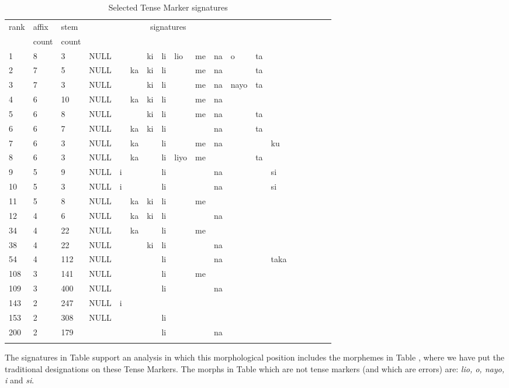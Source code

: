\documentclass[output=paper,colorlinks,citecolor=brown]{langscibook}
\begin{document}
 
\begin{table}

\label{top-TM-sigs}
\begin{tabular}{lllllllllllllllllll}\lsptoprule
rank& affix & stem  & \multicolumn{9}{c}{signatures} \\
 & count & count    \\ \midrule
1 & 8 & 3 & NULL &     && ki & li & lio & me & na & o  & ta  \\
2 &  7 & 5 & NULL &&  ka & ki & li &     & me & na &    & ta  \\
3 &  7 & 3 & NULL &&     & ki & li &     & me & na &  nayo &  ta \\
4 &  6 & 10& NULL &&  ka & ki & li &     & me & na \\
5 &  6 &  8 & NULL &&     & ki & li &      & me &  na &&   ta\\
6 &  6 & 7 & NULL &&  ka & ki & li &     &    & na &  & ta \\
7 &  6 & 3 & NULL &&  ka & & li &     & me &  na &&& ku \\
8 &  6 & 3 & NULL &&  ka &    & li & liyo &  me &&&  ta\\
9 &  5 & 9 & NULL &  i  &    && li &&&  na &&&  si\\
10 & 5 & 3 & NULL&  i  &    && li &&& na &&& si \\
11 & 5 & 8 & NULL && ka & ki & li &     & me \\
12 & 4 & 6 & NULL && ka & ki & li & & & na \\
34 & 4 &22 & NULL &&  ka &    &li  & & me \\
38 & 4 &22 & NULL &&     &  ki &  li  &&& na \\
54& 4 & 112 & NULL &&     &    & li &&&  na  &&&  taka \\
108 & 3 & 141 & NULL &&  & & li  && me \\
109 & 3 &  400 & NULL && & &  li  &&& na  \\
143 & 2 &  247 & NULL &  i \\
153 & 2 &  308 & NULL &&  & & li \\
200 & 2 &179 &&   &  &  & li &&& na \\
  \lspbottomrule
\end{tabular}
\caption{Selected Tense Marker signatures}
\label{TM-sigs}
\end{table}
 

The signatures in Table  support an analysis in which this morphological position includes the morphemes in Table , where we have put the traditional designations on these Tense Markers. The morphs in Table  which are not tense markers (and which are errors) are: \textit{lio, o, nayo, i} and \textit{si}. 
 
\end{document}
